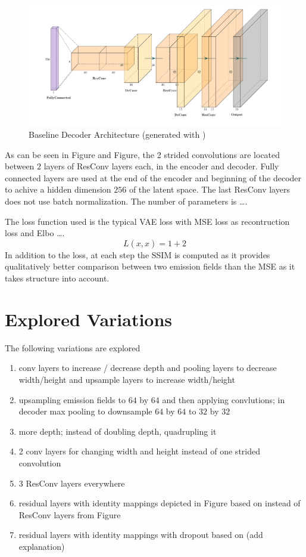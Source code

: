 \begin{figure}[h!]
    \centering
    \includegraphics[width=\textwidth]{figures/model_architecture/build/baseline_vae_decoder.pdf}
    \caption{Baseline Decoder Architecture (generated with \parencite{NNVisualization})}
\end{figure}
As can be seen in Figure and Figure, the 2 strided convolutions are located between $2$ layers of ResConv layers each, in the encoder and decoder.
Fully connected layers are used at the end of the encoder and beginning of the decoder to achive a hidden dimension $256$ of the latent space. 
The last ResConv layers does not use batch normalization.
The number of parameters is \dots.

The loss function used is the typical VAE loss with MSE loss as recontruction loss and Elbo \parencite{VAE} \dots .
\begin{equation}
    L(x, \hat{x}) = 1 + 2
\end{equation}
In addition to the loss, at each step the SSIM \parencite{SSIM} is computed as it provides qualitatively better comparison between two emission fields than the MSE as it takes structure into account.

\section{Explored Variations}
The following variations are explored
\begin{enumerate}
    \item conv layers to increase / decrease depth and pooling layers to decrease width/height and upsample layers to increase width/height
    \item upsampling emission fields to $64$ by $64$ and then applying convlutions; in decoder max pooling to downsample $64$ by $64$ to $32$ by $32$
    \item more depth; instead of doubling depth, quadrupling it
    \item 2 conv layers for changing width and height instead of one strided convolution
    \item 3 ResConv layers everywhere
    \item residual layers with identity mappings depicted in Figure based on \parencite{IdentityMappings} instead of ResConv layers from Figure
    \item residual layers with identity mappings with dropout \parencite{Dropout} based on \parencite{WideResNet} (add explanation)
\end{enumerate}

